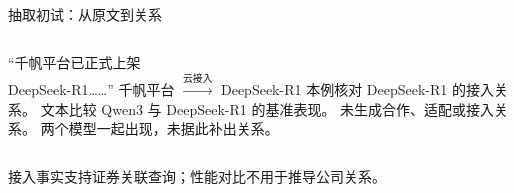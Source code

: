 \begin{frame}{抽取初试：从原文到关系}\relax
{}
\begin{columns}[T,onlytextwidth]
“千帆平台已正式上架\\DeepSeek-R1……”\Cite{baidu-qianfan}
\Gap
{}
千帆平台 $\xrightarrow{\text{云接入}}$ DeepSeek-R1
\Gap
本例核对 DeepSeek-R1 的接入关系。
文本比较 Qwen3 与 DeepSeek-R1 的基准表现。\Cite{qwen3-blog}
\Gap
{}
未生成合作、适配或接入关系。
\Gap
两个模型一起出现，未据此补出关系。
\end{columns}
\Gap
接入事实支持证券关联查询；性能对比不用于推导公司关系。
\end{frame}
